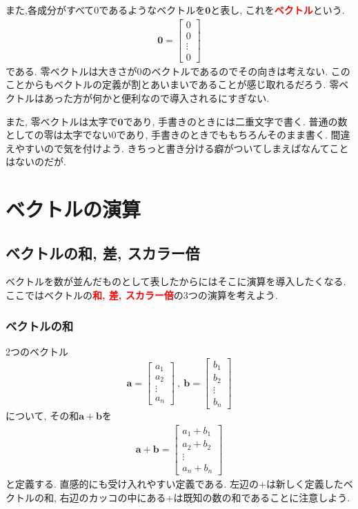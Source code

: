 また,各成分がすべて0であるようなベクトルを$\bm{0}$と表し, 
これを\textbf{\textcolor{red}{ベクトル}}という. 
\begin{eqnarray}
\bm{0} = \left[
 \begin{array}{c}
   0 \\
   0 \\
   \vdots \\
   0
  \end{array}
   \right]
\label{eq:reivec}
\end{eqnarray}
である. 零ベクトルは大きさが0のベクトルであるのでその向きは考えない. 
このことからもベクトルの定義が割とあいまいであることが感じ取れるだろう. 
零ベクトルはあった方が何かと便利なので導入されるにすぎない. 

また, 零ベクトルは太字で$\bm{0}$であり, 手書きのときには二重文字で書く. 
普通の数としての零は太字でない0であり, 手書きのときでももちろんそのまま書く. 
間違えやすいので気を付けよう. きちっと書き分ける癖がついてしまえばなんてことはないのだが. 
\section{ベクトルの演算}
\subsection{ベクトルの和, 差, スカラー倍}
ベクトルを数が並んだものとして表したからにはそこに演算を導入したくなる. 
ここではベクトルの\textbf{\textcolor{red}{和, 差, スカラー倍}}の3つの演算を考えよう. 
\subsubsection{ベクトルの和}
2つのベクトル
$$
\bm{a} = \left[
 \begin{array}{c}
   a_1 \\
   a_2 \\
   \vdots \\
   a_n 
 \end{array}
            \right]
\ , \ 
\bm{b} = \left[
 \begin{array}{c}
   b_1 \\
   b_2 \\
   \vdots \\
   b_n 
 \end{array}
            \right]
$$
について, その和$\bm{a}+\bm{b}$を
\begin{eqnarray}
\bm{a}+\bm{b} = \left[
 \begin{array}{c}
   a_1+b_1 \\
   a_2+b_2 \\
   \vdots \\
   a_n+b_n 
 \end{array}
\right]
\label{eqn:vecsum}
\end{eqnarray}
と定義する. 直感的にも受け入れやすい定義である. 
左辺の$+$は新しく定義したベクトルの和, 右辺のカッコの中にある$+$は既知の数の和であることに注意しよう. 
